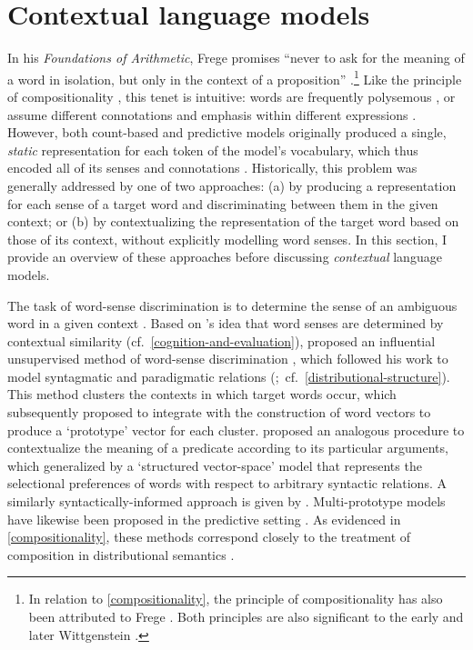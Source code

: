 \section{Contextual language models}
\label{contextual-language-models}

In his \emph{Foundations of Arithmetic}, Frege promises ``never to ask for the meaning
of a word in isolation, but only in the context of a proposition''
\parencites[xxii]{Frege1960}.\footnote{In relation to \cref{compositionality}, the
  principle of compositionality has also been attributed to Frege
  \parencites{Janssen2001}{Pelletier2001}.
  Both principles are also significant to the early and later Wittgenstein
  \parencites[159-188]{Baker2005}.
}
Like the principle of compositionality , this tenet is
intuitive: words are frequently polysemous \parencites[e.g.][173-174]{Kintsch2001}, or
assume different connotations and emphasis within different expressions
\parencites[e.g.][2-3]{Armendariz2020}.
However, both count-based  and predictive models
 originally produced a single, \emph{static}
representation for each token of the model's vocabulary, which thus encoded all of its
senses and connotations \parencites[e.g.][1]{Pelevina2016}.
Historically, this problem was generally addressed by one of two approaches: (a) by
producing a representation for each sense of a target word and discriminating between
them in the given context; or (b) by contextualizing the representation of the target
word based on those of its context, without explicitly modelling word senses.
In this section, I provide an overview of these approaches before discussing
\emph{contextual} language models.

The task of word-sense discrimination is to determine the sense of an ambiguous word in
a given context \parencites[97]{Schutze1998}.
Based on \citeauthor{Miller1991}'s idea that word senses are determined by contextual
similarity (cf.~\cref{cognition-and-evaluation}), \citeauthor{Schutze1998} proposed an
influential unsupervised method of word-sense discrimination
\parencites*[99]{Schutze1998}, which followed his work to model syntagmatic and
paradigmatic relations (\cite{Schutze1993};~cf.~\cref{distributional-structure}).
This method clusters the contexts in which target words occur, which
\textcites{Reisinger2010} subsequently proposed to integrate with the construction of
word vectors to produce a `prototype' vector for each cluster.
\textcites{Kintsch2001} proposed an analogous procedure to contextualize the meaning
of a predicate according to its particular arguments, which \textcites{Erk2008}
generalized by a `structured vector-space' model that represents the selectional
preferences of words with respect to arbitrary syntactic relations.
A similarly syntactically-informed approach is given by
\textcites{Thater2010}{Thater2011}.
Multi-prototype models have likewise been proposed in the predictive setting
\parencites[e.g.][]{Huang2012}{Tian2014}{Pelevina2016}.
As evidenced in \cref{compositionality}, these methods correspond closely to the
treatment of composition in distributional semantics
\parencites[e.g.][]{Mitchell2008}{Mitchell2009}{Mitchell2010}{Dinu2010}.

